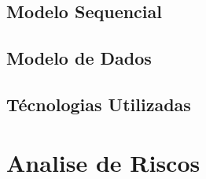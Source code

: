 \subsection{Modelo Sequencial}

\subsection{Modelo de Dados}

\subsection{Técnologias Utilizadas}

\section{Analise de Riscos}
\label{analiseriscos}
\blankpage

\glsresetall
